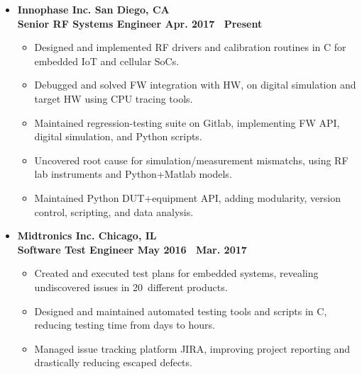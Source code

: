 \documentclass[10pt, letterpaper]{letter}
\def\myplus{\hspace{-.3em}\raisebox{.4ex}{ \tiny +}}
\def\csharp{C\nolinebreak[4]\hspace{-.3em}\raisebox{.25ex}{ \small \#}}
\begin{document}
\begin{itemize}[label=$\bullet$, leftmargin=1em]

    \item
    \textbf{Innophase Inc. \hfill San Diego, CA}\vspace{2pt}\\
    \textbf{Senior RF Systems Engineer \hfill Apr. 2017 \textendash\ Present}\vspace{2pt}
    \begin{itemize}[nosep, leftmargin=1.15em]
        \item Designed and implemented RF drivers and calibration routines in C for embedded IoT and cellular SoCs.
        \item Debugged and solved FW integration with HW, on digital simulation and target HW using CPU tracing tools.
        \item Maintained regression-testing suite on Gitlab, implementing FW API, digital simulation, and Python scripts.
        \item Uncovered root cause for simulation/measurement mismatchs, using RF lab instruments and Python+Matlab models.
        \item Maintained Python DUT+equipment API, adding modularity, version control, scripting, and data analysis.
    \end{itemize}

\vfill

    \item
    \textbf{Midtronics Inc. \hfill Chicago, IL}\vspace{2pt}\\
    \textbf{Software Test Engineer \hfill May 2016 \textendash\ Mar. 2017}\vspace{2pt}
    \begin{itemize}[nosep, leftmargin=1.15em]
	\item Created and executed test plans for embedded systems, revealing undiscovered issues in 20\myplus\ different products.
	\item Designed and maintained automated testing tools and scripts in \csharp, reducing testing time from days to hours.
        \item Managed issue tracking platform JIRA, improving project reporting and drastically reducing escaped defects.
    \end{itemize}


\end{itemize}
\end{document}
